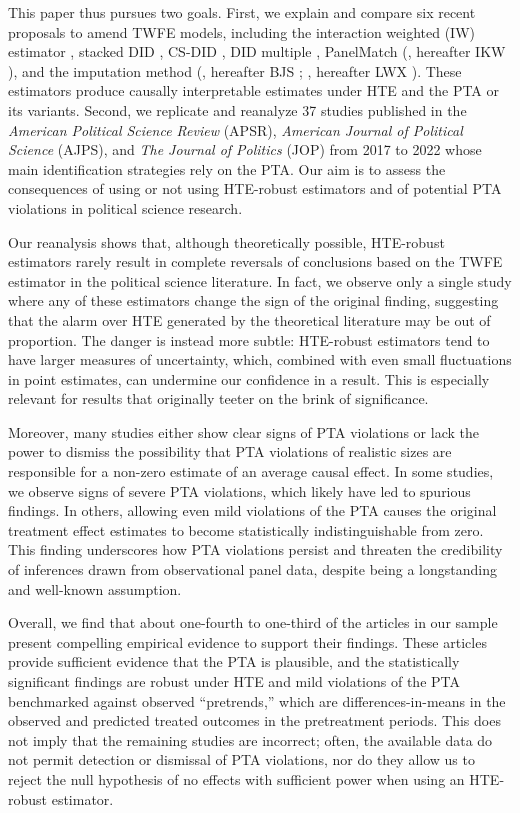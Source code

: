 \documentclass[12pt]{article}
\begin{document}
This paper thus pursues two goals. First, we explain and compare six recent proposals to amend TWFE models, including the interaction weighted (IW) estimator \citep{sun2021-event}, stacked DID \citep{BLW2022}, CS-DID \citep{Callaway2021-am}, DID multiple \citep{De_Chaisemartin2017-dk}, PanelMatch (\citealt{IKW2021}, hereafter IKW \citeyear{IKW2021}), and the imputation method (\citealt{BJS2021}, hereafter BJS \citeyear{BJS2021}; \citealt{LWX2022}, hereafter LWX \citeyear{LWX2022}). These estimators produce causally interpretable estimates under HTE and the PTA or its variants. Second, we replicate and reanalyze 37 studies published in the {\it American Political Science Review} (APSR), {\it American Journal of Political Science} (AJPS), and {\it The Journal of Politics} (JOP) from 2017 to 2022 whose main identification strategies rely on the PTA. Our aim is to assess the consequences of using or not using HTE-robust estimators and of potential PTA violations in political science research.

Our reanalysis shows that, although theoretically possible, HTE-robust estimators rarely result in complete reversals of conclusions based on the TWFE estimator in the political science literature. In fact, we observe only a single study where any of these estimators change the sign of the original finding, suggesting that the alarm over HTE generated by the theoretical literature may be out of proportion. The danger is instead more subtle: HTE-robust estimators tend to have larger measures of uncertainty, which, combined with even small fluctuations in point estimates, can undermine our confidence in a result. This is especially relevant for results that originally teeter on the brink of significance.  

Moreover, many studies either show clear signs of PTA violations or lack the power to dismiss the possibility that PTA violations of realistic sizes are responsible for a non-zero estimate of an average causal effect. In some studies, we observe signs of severe PTA violations, which likely have led to spurious findings. In others, allowing even mild violations of the PTA causes the original treatment effect estimates to become statistically indistinguishable from zero. This finding underscores how PTA violations persist and threaten the credibility of inferences drawn from observational panel data, despite being a longstanding and well-known assumption.

Overall, we find that about one-fourth to one-third of the articles in our sample present compelling empirical evidence to support their findings. These articles provide sufficient evidence that the PTA is plausible, and the statistically significant findings are robust under HTE and mild violations of the PTA benchmarked against observed ``pretrends,'' which are differences-in-means in the observed and predicted treated outcomes in the pretreatment periods. This does not imply that the remaining studies are incorrect; often, the available data do not permit detection or dismissal of PTA violations, nor do they allow us to reject the null hypothesis of no effects with sufficient power when using an HTE-robust estimator.
\end{document}
